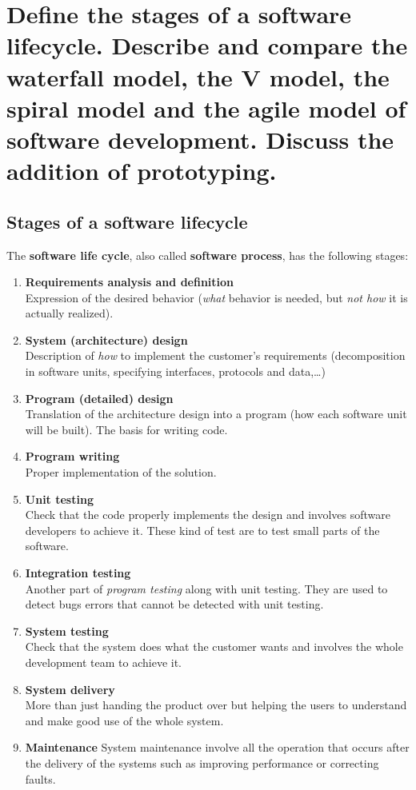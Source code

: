 \clearpage{}
\section{Define the stages of a software lifecycle. Describe and compare the
waterfall model, the V model, the spiral model and the agile model of
software development. Discuss the addition of prototyping.}

\subsection{Stages of a software lifecycle}

The \textbf{software life cycle}, also called \textbf{software process}, has the following stages:

\begin{enumerate}
    \item \textbf{Requirements analysis and definition}\\
    Expression of the desired behavior (\textit{what} behavior is needed, but \textit{not how} it is actually realized).
    \item \textbf{System (architecture) design}\\
     Description of \textit{how} to implement the customer's requirements (decomposition in software units, specifying interfaces, protocols and data,\ldots)
    \item \textbf{Program (detailed) design}\\
     Translation of the architecture design into a program (how each software unit will be built). The basis for writing code.
    \item \textbf{Program writing}\\
     Proper implementation of the solution.
    \item \textbf{Unit testing}\\
     Check that the code properly implements the design and involves software developers to achieve it.
     These kind of test are to test small parts of the software.
    \item \textbf{Integration testing}\\
     Another part of \textit{program testing} along with unit testing. They are used to detect bugs
     errors that cannot be detected with unit testing.
    \item \textbf{System testing}\\
    Check that the system does what the customer wants and involves the whole development team to achieve it.
    \item \textbf{System delivery}\\
     More than just handing the product over but helping the users to understand and make good use of the whole system.
    \item \textbf{Maintenance}
    System maintenance involve all the operation that occurs after the delivery of the systems such as 
    improving performance or correcting faults.
\end{enumerate}

